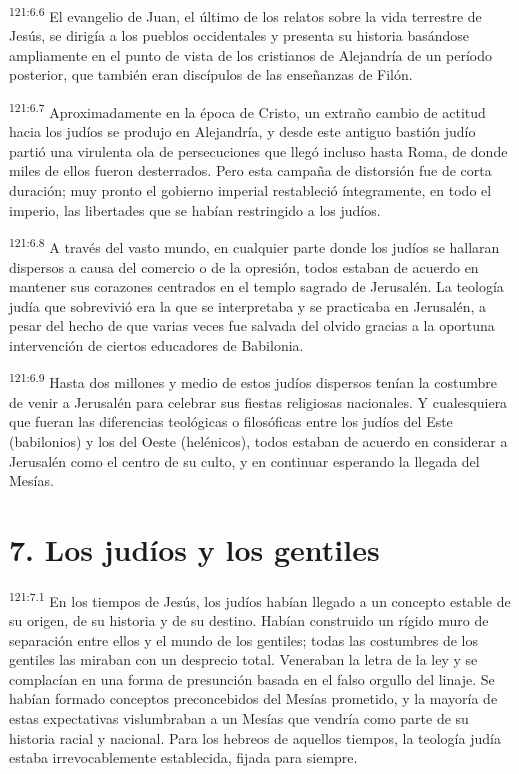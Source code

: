 \par 
\textsuperscript{121:6.6} El evangelio de Juan, el último de los relatos sobre la vida terrestre de Jesús, se dirigía a los pueblos occidentales y presenta su historia basándose ampliamente en el punto de vista de los cristianos de Alejandría de un período posterior, que también eran discípulos de las enseñanzas de Filón.

\par 
\textsuperscript{121:6.7} Aproximadamente en la época de Cristo, un extraño cambio de actitud hacia los judíos se produjo en Alejandría, y desde este antiguo bastión judío partió una virulenta ola de persecuciones que llegó incluso hasta Roma, de donde miles de ellos fueron desterrados. Pero esta campaña de distorsión fue de corta duración; muy pronto el gobierno imperial restableció íntegramente, en todo el imperio, las libertades que se habían restringido a los judíos.

\par 
\textsuperscript{121:6.8} A través del vasto mundo, en cualquier parte donde los judíos se hallaran dispersos a causa del comercio o de la opresión, todos estaban de acuerdo en mantener sus corazones centrados en el templo sagrado de Jerusalén. La teología judía que sobrevivió era la que se interpretaba y se practicaba en Jerusalén, a pesar del hecho de que varias veces fue salvada del olvido gracias a la oportuna intervención de ciertos educadores de Babilonia.

\par 
\textsuperscript{121:6.9} Hasta dos millones y medio de estos judíos dispersos tenían la costumbre de venir a Jerusalén para celebrar sus fiestas religiosas nacionales. Y cualesquiera que fueran las diferencias teológicas o filosóficas entre los judíos del Este (babilonios) y los del Oeste (helénicos), todos estaban de acuerdo en considerar a Jerusalén como el centro de su culto, y en continuar esperando la llegada del Mesías.

\section*{7. Los judíos y los gentiles}
\par 
\textsuperscript{121:7.1} En los tiempos de Jesús, los judíos habían llegado a un concepto estable de su origen, de su historia y de su destino. Habían construido un rígido muro de separación entre ellos y el mundo de los gentiles; todas las costumbres de los gentiles las miraban con un desprecio total. Veneraban la letra de la ley y se complacían en una forma de presunción basada en el falso orgullo del linaje. Se habían formado conceptos preconcebidos del Mesías prometido, y la mayoría de estas expectativas vislumbraban a un Mesías que vendría como parte de su historia racial y nacional. Para los hebreos de aquellos tiempos, la teología judía estaba irrevocablemente establecida, fijada para siempre.

